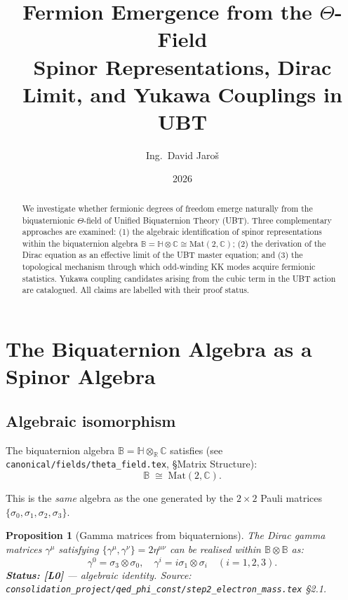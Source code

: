 \documentclass[11pt,a4paper]{article}
\title{Fermion Emergence from the \texorpdfstring{$\Theta$}{Theta}-Field\\
\large Spinor Representations, Dirac Limit, and Yukawa Couplings in UBT}
\author{Ing.\ David Jaroš}
\date{2026}
\newtheorem{proposition}{Proposition}
\begin{document}
\maketitle

\begin{abstract}
We investigate whether fermionic degrees of freedom emerge naturally from the
biquaternionic $\Theta$-field of Unified Biquaternion Theory (UBT).  Three
complementary approaches are examined: (1) the algebraic identification of
spinor representations within the biquaternion algebra
$\mathbb{B} = \mathbb{H}\otimes\mathbb{C} \cong \mathrm{Mat}(2,\mathbb{C})$;
(2) the derivation of the Dirac equation as an effective limit of the UBT
master equation; and (3) the topological mechanism through which
odd-winding KK modes acquire fermionic statistics.
Yukawa coupling candidates arising from the cubic term in the UBT action
are catalogued.  All claims are labelled with their proof status.
\end{abstract}

\tableofcontents

\section{The Biquaternion Algebra as a Spinor Algebra}
\label{sec:algebra}

\subsection{Algebraic isomorphism}

The biquaternion algebra $\mathbb{B} = \mathbb{H}\otimes_\mathbb{R}\mathbb{C}$
satisfies (see \texttt{canonical/fields/theta\_field.tex}, §Matrix Structure):
\begin{equation}
\label{eq:iso}
  \mathbb{B} \;\cong\; \mathrm{Mat}(2,\mathbb{C}).
\end{equation}

This is the \emph{same} algebra as the one generated by the $2\times 2$
Pauli matrices $\{\sigma_0, \sigma_1, \sigma_2, \sigma_3\}$.

\begin{proposition}[Gamma matrices from biquaternions]\label{prop:gamma}
  The Dirac gamma matrices $\gamma^\mu$ satisfying
  $\{\gamma^\mu,\gamma^\nu\} = 2\eta^{\mu\nu}$
  can be realised within $\mathbb{B}\otimes\mathbb{B}$ as:
  \begin{equation}
    \gamma^0 = \sigma_3\otimes\sigma_0, \quad
    \gamma^i = i\sigma_1\otimes\sigma_i \quad (i=1,2,3).
  \end{equation}
  \textbf{Status: [L0]} — algebraic identity.  Source:
  \texttt{consolidation\_project/qed\_phi\_const/step2\_electron\_mass.tex} §2.1.
\end{proposition}
\end{document}
